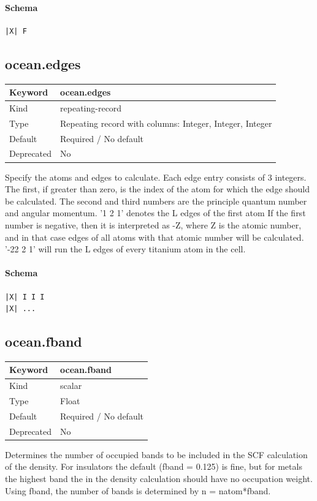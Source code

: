 \documentclass[11pt]{article}
\begin{document}
{{{{{\paragraph{Schema}
\begin{Verbatim}
|X| F
\end{Verbatim}

\subsection{ocean.edges}
\label{kw:ocean-edges}
\begin{longtable}{|p{1.5in}|p{4.5in}|}
\hline
Keyword & ocean.edges \\
\hline
Kind & repeating-record \\
\hline
Type & Repeating record with columns: Integer, Integer, Integer \\
\hline
Default & Required / No default \\
\hline
Deprecated & No \\
\hline
\end{longtable}
 Specify the atoms and edges to calculate. Each edge entry consists of 3
 integers. The first, if greater than zero, is the index of the atom for
 which the edge should be calculated. The second and third numbers are the
 principle quantum number and angular momentum.
 '1 2 1' denotes the L edges of the first atom
 If the first number is negative, then it is interpreted as -Z, where
 Z is the atomic number, and in that case edges of all atoms with that
 atomic number will be calculated.
 '-22 2 1' will run the L edges of every titanium atom in the cell.

\paragraph{Schema}
\begin{Verbatim}
|X| I I I
|X| ...
\end{Verbatim}

\subsection{ocean.fband}
\label{kw:ocean-fband}
\begin{longtable}{|p{1.5in}|p{4.5in}|}
\hline
Keyword & ocean.fband \\
\hline
Kind & scalar \\
\hline
Type & Float \\
\hline
Default & Required / No default \\
\hline
Deprecated & No \\
\hline
\end{longtable}
 Determines the number of occupied bands to be included in the SCF calculation
 of the density. For insulators the default (fband = 0.125) is fine, but
 for metals the highest band the in the density calculation should have no
 occupation weight. Using fband, the number of bands is determined by
 n = natom*fband.

}}}}}
\end{document}
